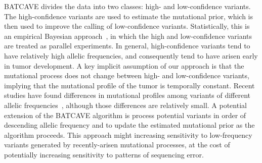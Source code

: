 \documentclass[a4,center,fleqn]{NAR}
\newcommand{\batcave}{BATCAVE }
\begin{document}
\batcave divides the data into two classes: high- and low-confidence variants.
The high-confidence variants are used to estimate the mutational prior, which is then used to improve the calling of low-confidence variants.
Statistically, this is an empirical Bayesian approach~\citep{Robbins1954}, in which the high and low-confidence variants are treated as parallel experiments\citep{Morris1983,Efron2014}. 
In general, high-confidence variants tend to have relatively high allelic frequencies, and consequently tend to have arisen early in tumor development.
A key implicit assumption of our approach is that the mutational process does not change between high- and low-confidence variants, implying that the mutational profile of the tumor is temporally constant.
Recent studies have found differences in mutational profiles among variants of different allelic frequencies~\citep{Rubanova2018a}, although those differences are relatively small.
A potential extension of the \batcave algorithm is process potential variants in order of descending allelic frequency and to update the estimated mutational prior as the algorithm proceeds.
This approach might increasing sensitivity to low-frequency variants generated by recently-arisen mutational processes, at the cost of potentially increasing sensitivity to patterns of sequencing error.

\end{document}
